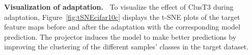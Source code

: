 \documentclass{article}
\newcommand{\mypar}[1]{\vspace{3pt}\noindent\textbf{#1~}}
\newcommand{\ppm}{\,\scriptsize$\pm$}
\newcommand{\dorowcolors}{\rowcolors{2}{gray!15}{white}}
\begin{document}

\mypar{Visualization of adaptation.} To visualize the effect of ClusT3 during adaptation, Figure~\ref{fig:tSNEcifar10c} displays the t-SNE plots of the target feature maps before and after the adaptation with the corresponding model prediction. The projector induces the model to make better predictions by improving the clustering of the different samples' classes in the target dataset.
\end{document}
